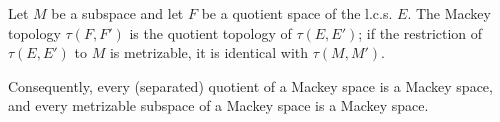 Let $M$ be a subspace and let $F$ be a quotient space of the l.c.s. $E$. The Mackey topology $\tau(F, F')$ is the quotient topology of $\tau(E, E')$; if the restriction of $\tau(E, E')$ to $M$ is metrizable, it is identical with $\tau(M, M')$.

Consequently, every (separated) quotient of a Mackey space is a Mackey space, and every metrizable subspace of a Mackey space is a Mackey space.
